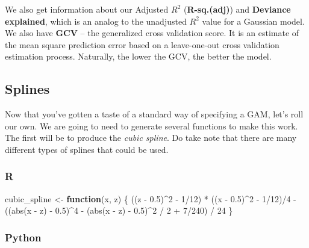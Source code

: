 \documentclass[
  letterpaper,
]{krantz}
\newenvironment{Shaded}{}{}
\newcommand{\ControlFlowTok}[1]{\textcolor[rgb]{0.00,0.44,0.13}{\textbf{#1}}}
\newcommand{\DecValTok}[1]{\textcolor[rgb]{0.25,0.63,0.44}{#1}}
\newcommand{\FloatTok}[1]{\textcolor[rgb]{0.25,0.63,0.44}{#1}}
\newcommand{\FunctionTok}[1]{\textcolor[rgb]{0.02,0.16,0.49}{#1}}
\newcommand{\NormalTok}[1]{#1}
\newcommand{\OtherTok}[1]{\textcolor[rgb]{0.00,0.44,0.13}{#1}}
\newcommand{\SpecialCharTok}[1]{\textcolor[rgb]{0.25,0.44,0.63}{#1}}
\begin{document}
We also get information about our Adjusted \(R^2\) (\textbf{R-sq.(adj)})
and \textbf{Deviance explained}, which is an analog to the unadjusted
\(R^2\) value for a Gaussian model. We also have \textbf{GCV} -- the
generalized cross validation score. It is an estimate of the mean square
prediction error based on a leave-one-out cross validation estimation
process. Naturally, the lower the GCV, the better the model.

\subsection{Splines}\label{splines}

Now that you've gotten a taste of a standard way of specifying a GAM,
let's roll our own. We are going to need to generate several functions
to make this work. The first will be to produce the \emph{cubic spline}.
Do take note that there are many different types of splines that could
be used.

\subsubsection{R}

\begin{Shaded}
\begin{Highlighting}[]
\NormalTok{cubic\_spline }\OtherTok{\textless{}{-}} \ControlFlowTok{function}\NormalTok{(x, z) \{}
\NormalTok{  ((z }\SpecialCharTok{{-}} \FloatTok{0.5}\NormalTok{)}\SpecialCharTok{\^{}}\DecValTok{2} \SpecialCharTok{{-}} \DecValTok{1}\SpecialCharTok{/}\DecValTok{12}\NormalTok{) }\SpecialCharTok{*}\NormalTok{ ((x }\SpecialCharTok{{-}} \FloatTok{0.5}\NormalTok{)}\SpecialCharTok{\^{}}\DecValTok{2} \SpecialCharTok{{-}} \DecValTok{1}\SpecialCharTok{/}\DecValTok{12}\NormalTok{)}\SpecialCharTok{/}\DecValTok{4} \SpecialCharTok{{-}}
\NormalTok{    ((}\FunctionTok{abs}\NormalTok{(x }\SpecialCharTok{{-}}\NormalTok{ z) }\SpecialCharTok{{-}} \FloatTok{0.5}\NormalTok{)}\SpecialCharTok{\^{}}\DecValTok{4} \SpecialCharTok{{-}}\NormalTok{ (}\FunctionTok{abs}\NormalTok{(x }\SpecialCharTok{{-}}\NormalTok{ z) }\SpecialCharTok{{-}} \FloatTok{0.5}\NormalTok{)}\SpecialCharTok{\^{}}\DecValTok{2} \SpecialCharTok{/} \DecValTok{2} \SpecialCharTok{+} \DecValTok{7}\SpecialCharTok{/}\DecValTok{240}\NormalTok{) }\SpecialCharTok{/} \DecValTok{24}
\NormalTok{\}}
\end{Highlighting}
\end{Shaded}

\subsubsection{Python}
\end{document}
